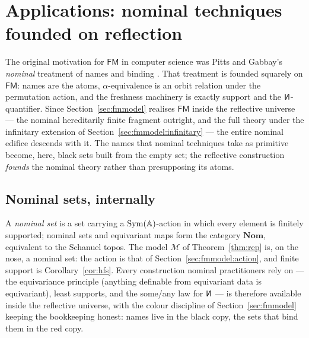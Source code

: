 
\section{Applications: nominal techniques founded on reflection}
\label{sec:applications}

The original motivation for $\mathsf{FM}$ in computer science was Pitts and
Gabbay's \emph{nominal} treatment of names and binding
\cite{DBLP:journals/fac/GabbayP02}. That treatment is founded squarely on
$\mathsf{FM}$: names are the atoms, $\alpha$-equivalence is an orbit relation
under the permutation action, and the freshness machinery is exactly support and
the $\new$-quantifier. Since Section~\ref{sec:fmmodel} realises $\mathsf{FM}$
inside the reflective universe --- the nominal hereditarily finite fragment
outright, and the full theory under the infinitary extension of
Section~\ref{sec:fmmodel:infinitary} --- the entire nominal edifice descends with
it. The names that nominal techniques take as primitive become, here, black sets
built from the empty set; the reflective construction \emph{founds} the nominal
theory rather than presupposing its atoms.

\subsection{Nominal sets, internally}
\label{sec:applications:nom}

A \emph{nominal set} is a set carrying a $\mathrm{Sym}(\mathbb{A})$-action in which every
element is finitely supported; nominal sets and equivariant maps form the
category $\mathbf{Nom}$, equivalent to the Schanuel topos. The model
$\mathcal{M}$ of Theorem~\ref{thm:rep} is, on the nose, a nominal set: the action
is that of Section~\ref{sec:fmmodel:action}, and finite support is
Corollary~\ref{cor:hfs}. Every construction nominal practitioners rely on ---
the equivariance principle (anything definable from equivariant data is
equivariant), least supports, and the some/any law for $\new$ --- is therefore
available inside the reflective universe, with the colour discipline of
Section~\ref{sec:fmmodel} keeping the bookkeeping honest: names live in the
{\bk black} copy, the sets that bind them in the {\rd red} copy.

